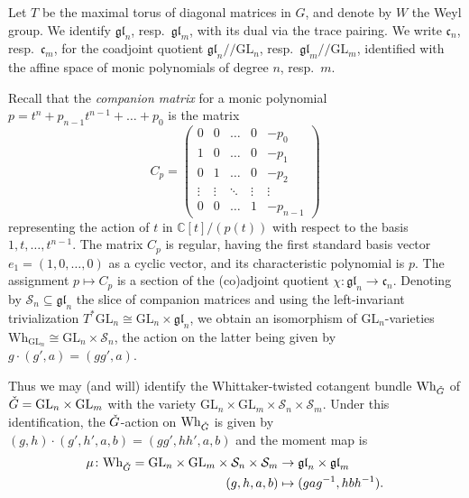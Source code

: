 \documentclass[11pt]{article}
\theoremstyle{definition}
\theoremstyle{plain}
\theoremstyle{remark}
\newcommand{\GL}{\mathrm{GL}}
\newcommand{\numberset}{\mathbb}
\newcommand{\C}{\numberset{C}}
\newcommand{\git}{/\!\!/}
\newcommand{\gl}{\mathfrak{gl}}
\begin{document}
        Let $T$ be the maximal torus of diagonal matrices in $G$, and denote by $W$ the Weyl group. We identify $\gl_n$, resp.\ $\gl_m$, with its dual via the trace pairing. We write $\mathfrak{c}_n$, resp.\ $\mathfrak{c}_m$, for the coadjoint quotient $\gl_n \git \GL_n$, resp.\ $\gl_m \git \GL_m$, identified with the affine space of monic polynomials of degree $n$, resp.\ $m$.
        
        Recall that the \emph{companion matrix} for a monic polynomial $p = t^n + p_{n-1}t^{n-1} + \dots + p_0$ is the matrix
        \[
            C_p=
            \begin{pmatrix*}
                0 & 0 & \dots & 0 & -p_0 \\
                1 & 0 & \dots & 0 & -p_1 \\
                0 & 1 & \dots & 0 & -p_2 \\
                \vdots & \vdots & \ddots & \vdots & \vdots \\
                0 & 0 & \dots & 1 & -p_{n-1}
            \end{pmatrix*}
        \]
        representing the action of $t$ in $\C[t]/(p(t))$ with respect to the basis $1,t,\dots,t^{n-1}$. The matrix $C_p$ is regular, having the first standard basis vector $e_1 = (1,0,\dots,0)$ as a cyclic vector, and its characteristic polynomial is $p$. The assignment $p \mapsto C_p$ is a section of the (co)adjoint quotient $\chi\colon \gl_{n} \to \mathfrak{c}_n$. Denoting by $\mathcal{S}_n \subseteq \gl_n$ the slice of companion matrices and using the left-invariant trivialization $T^*\GL_n \cong \GL_n \times \gl_n$, we obtain an isomorphism of $\GL_n$-varieties $\mathrm{Wh}_{\GL_n} \cong \GL_n \times \mathcal{S}_n$, the action on the latter being given by $g \cdot (g',a) = (gg',a)$.

        Thus we may (and will) identify the Whittaker-twisted cotangent bundle $\mathrm{Wh}_{\Check{G}}$ of $\Check{G} = \GL_n \times \GL_m$ with the variety $\GL_n \times \GL_m \times \mathcal{S}_n \times \mathcal{S}_m$. Under this identification, the $\Check{G}$-action on $\mathrm{Wh}_{\Check{G}}$ is given by $(g,h) \cdot (g',h',a,b) = (gg',hh',a,b)$ and the moment map is
        \begin{align}
            \mu\colon \mathrm{Wh}_{\Check{G}} = \GL_n \times \GL_m \times \mathcal{S}_n \times \mathcal{S}_m &\to \gl_n \times \gl_m \nonumber \\
            (g,h,a,b) &\mapsto (gag^{-1},hbh^{-1}). \label{eq-momentmap}
        \end{align}        
\end{document}

